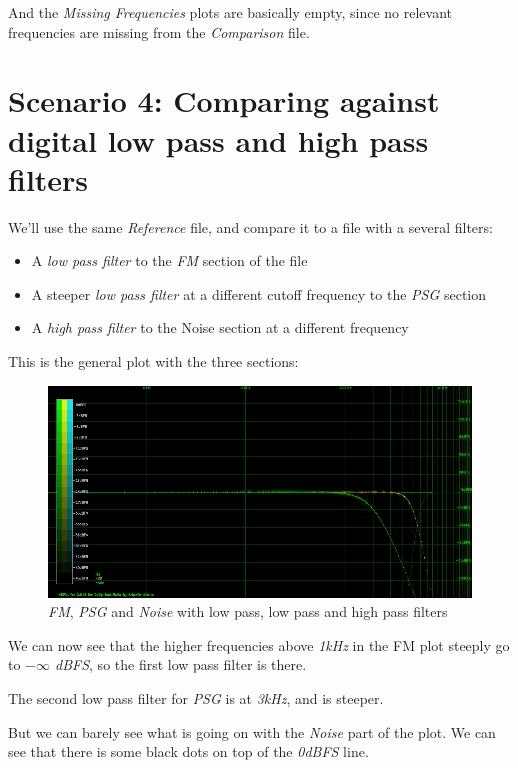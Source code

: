 \documentclass[10pt,a4paper]{report}
\begin{document}
And the \textit{Missing Frequencies} plots are basically empty, since no relevant frequencies are missing from the \textit{Comparison} file.

\section{Scenario 4: Comparing against digital low pass and high pass filters}

We'll use the same \textit{Reference} file, and compare it to a file with a several filters:

\begin{itemize}
	\item A \textit{low pass filter} to the \textit{FM} section of the file
	\item A steeper \textit{low pass filter} at a different cutoff frequency to the \textit{PSG} section
	\item A \textit{high pass filter} to the Noise section at a different frequency
\end{itemize}

This is the general plot with the three sections:

\begin{figure}[H]
	\centering
	\includegraphics[width=1.0\linewidth]{plots/Plot4-1-All.png}
	\caption[All Plotted]{\textit{FM}, \textit{PSG} and \textit{Noise} with low pass, low pass and high pass filters}
	\label{fig:plot4-1-all}
\end{figure}

We can now see that the higher frequencies above \textit{1kHz} in the FM plot steeply go to \textit{$-\infty$ dBFS}, so the first low pass filter is there.

The second low pass filter for \textit{PSG} is at \textit{3kHz}, and is steeper.

But we can barely see what is going on with the \textit{Noise} part of the plot. We can see that there is some black dots on top of the \textit{0dBFS} line.
\end{document}
